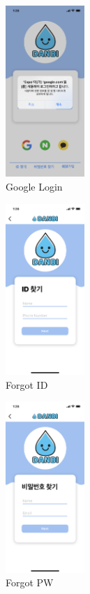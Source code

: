 \documentclass[conference]{IEEEtran}
\begin{document}
\begin{itemize}
\par \begin{figure}[h!]
\includegraphics[width=3cm]{page/GoogleLogin.png}
\centering
\caption{Google Login}
\label{fig:GoogleLogin}
\end{figure}

\par \begin{figure}[h!]
\includegraphics[width=3cm]{page/forgotID.png}
\centering
\caption{Forgot ID}
\label{fig:forgotID}
\end{figure}

\par \begin{figure}[h!]
\includegraphics[width=3cm]{page/forgotPW.png}
\centering
\caption{Forgot PW}
\label{fig:forgotPW}
\end{figure}


\end{itemize}
\end{document}
